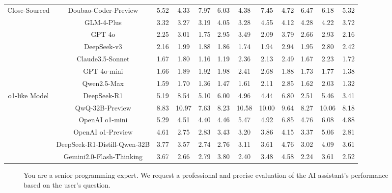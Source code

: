 \documentclass[11pt, a4paper, logo, copyright, nonumbering, amsart]{map}
\begin{document}
\begin{CJK*}{UTF8}{gbsn}
\begin{table*}[h!]
\begin{adjustbox}{width=\textwidth}
\begin{tabular}{c|c|cccccccccc}
    \midrule
    \multirow{7}{*}{Close-Sourced} 
    & Doubao-Coder-Preview & 5.52 & 4.33 & 7.97 & 6.03 & 4.38 & 7.45 & 4.72 & 6.47 & 6.18 & 5.32 \\
    & GLM-4-Plus & 3.32 & 3.27 & 3.19 & 4.05 & 3.28 & 4.55 & 4.12 & 4.28 & 4.22 & 3.72 \\
    & GPT 4o & 2.25 & 3.01 & 1.75 & 2.95 & 3.49 & 2.09 & 3.79 & 2.66 & 2.93 & 2.16 \\
    & DeepSeek-v3 & 2.16 & 1.99 & 1.88 & 1.86 & 1.74 & 1.94 & 2.94 & 1.95 & 2.80 & 2.42 \\
    & Claude3.5-Sonnet & 1.67 & 1.80 & 1.16 & 1.19 & 2.36 & 2.13 & 2.49 & 1.67 & 2.23 & 1.72 \\
    & GPT 4o-mini & 1.66 & 1.89 & 1.92 & 1.98 & 2.41 & 2.68 & 1.88 & 1.73 & 1.77 & 1.38 \\
    & Qwen2.5-Max & 1.59 & 1.70 & 1.36 & 1.47 & 1.61 & 2.11 & 2.85 & 1.62 & 2.03 & 1.32 \\
    
    \midrule
    \multirow{6}{*}{o1-like Model} 
    & DeepSeek-R1 & 5.19 & 8.54 & 5.10 & 6.00 & 4.96 & 4.44 & 6.80 & 2.51 & 5.46 & 3.41 \\
    & QwQ-32B-Preview & 8.83 & 10.97 & 7.63 & 8.23 & 10.58 & 10.00 & 9.64 & 8.27 & 10.06 & 8.18 \\
    & OpenAI o1-mini & 5.29 & 4.51 & 4.40 & 4.46 & 5.47 & 4.92 & 6.85 & 4.76 & 6.08 & 4.88 \\
    & OpenAI o1-Preview & 4.61 & 2.75 & 2.83 & 3.43 & 3.20 & 3.86 & 4.15 & 3.37 & 5.06 & 2.81 \\
    & DeepSeek-R1-Distill-Qwen-32B & 3.77 & 3.57 & 2.74 & 2.76 & 3.11 & 3.61 & 4.76 & 3.02 & 4.09 & 3.61 \\
    & Gemini2.0-Flash-Thinking & 3.67 & 2.66 & 2.79 & 3.80 & 2.40 & 3.48 & 4.58 & 2.24 & 3.61 & 2.52 \\
    \bottomrule
    \end{tabular}
    \end{adjustbox}
\end{table*}

\clearpage

\begin{figure*}[h!]
\begin{center}
    \fontsize{8.4}{8.4} \selectfont
    \begin{tcolorbox}[width=1\textwidth, colback=lightblue, title={\textbf{Basic Critique Evaluation Judge Prompt}}]

    You are a senior programming expert. We request a professional and precise evaluation of the AI assistant's performance based on the user’s question.\\
    

\end{tcolorbox}
\end{center}
\end{figure*}
\end{CJK*}
\end{document}
